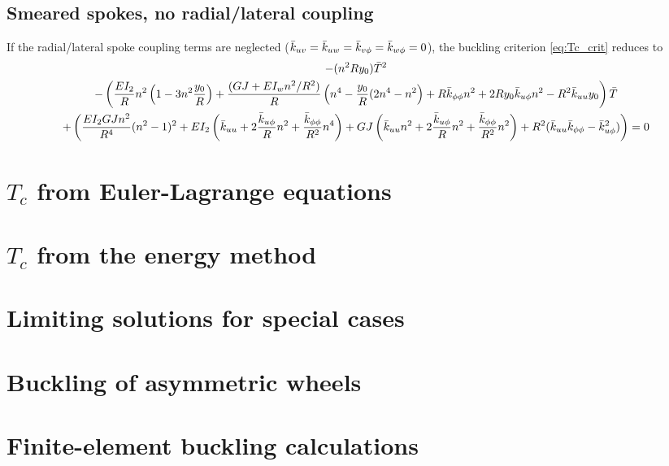 \documentclass[\rootdir/thesis.tex]{subfiles}
\begin{document}
\subsection{Smeared spokes, no radial/lateral coupling}

If the radial/lateral spoke coupling terms are neglected ($\bar{k}_{uv}=\bar{k}_{uw}=\bar{k}_{v\phi}=\bar{k}_{w\phi}=0$), the buckling criterion \eqref{eq:Tc_crit} reduces to
\begin{multline}
\label{eq:Tc_quad}
-(n^2Ry_0)\bar{T}^2\\
-\left(\frac{EI_2}{R}n^2\left(1 - 3n^2 \frac{y_0}{R} \right)
       +\frac{(GJ + EI_wn^2/R^2)}{R}\left(n^4 - \frac{y_0}{R}(2n^4 - n^2\right)
       +R\bar{k}_{\phi\phi} n^2 + 2Ry_0\bar{k}_{u\phi} n^2 - R^2\bar{k}_{uu} y_0\right)\bar{T}\\
+\left(\frac{EI_2 GJ n^2}{R^4}(n^2-1)^2
	   +EI_2\left(\bar{k}_{uu} + 2\frac{\bar{k}_{u\phi}}{R}n^2 + \frac{\bar{k}_{\phi\phi}}{R^2}n^4\right)
	   +GJ\left(\bar{k}_{uu} n^2 + 2\frac{\bar{k}_{u\phi}}{R}n^2 + \frac{\bar{k}_{\phi\phi}}{R^2}n^2\right)
	   +R^2(\bar{k}_{uu}\bar{k}_{\phi\phi} - \bar{k}_{u\phi}^2)\right) = 0
\end{multline}

\section{$T_c$ from Euler-Lagrange equations}

\section{$T_c$ from the energy method}

\section{Limiting solutions for special cases}

\section{Buckling of asymmetric wheels}

\section{Finite-element buckling calculations}
\end{document}
